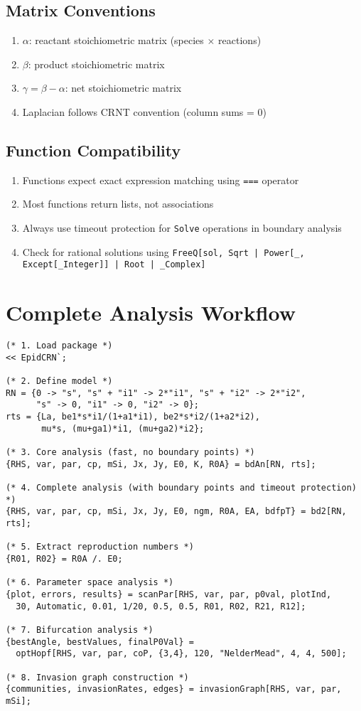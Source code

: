 \documentclass{article}
\begin{document}
\subsection{Matrix Conventions}
\begin{enumerate}
\item $\alpha$: reactant stoichiometric matrix (species $\times$ reactions)
\item $\beta$: product stoichiometric matrix
\item $\gamma = \beta - \alpha$: net stoichiometric matrix
\item Laplacian follows CRNT convention (column sums = 0)
\end{enumerate}

\subsection{Function Compatibility}
\begin{enumerate}
\item Functions expect exact expression matching using \texttt{===} operator
\item Most functions return lists, not associations
\item Always use timeout protection for \texttt{Solve} operations in boundary analysis
\item Check for rational solutions using \texttt{FreeQ[sol, Sqrt | Power[\_, Except[\_Integer]] | Root | \_Complex]}
\end{enumerate}

\section{Complete Analysis Workflow}

\begin{lstlisting}
(* 1. Load package *)
<< EpidCRN`;

(* 2. Define model *)
RN = {0 -> "s", "s" + "i1" -> 2*"i1", "s" + "i2" -> 2*"i2",
      "s" -> 0, "i1" -> 0, "i2" -> 0};
rts = {La, be1*s*i1/(1+a1*i1), be2*s*i2/(1+a2*i2),
       mu*s, (mu+ga1)*i1, (mu+ga2)*i2};

(* 3. Core analysis (fast, no boundary points) *)
{RHS, var, par, cp, mSi, Jx, Jy, E0, K, R0A} = bdAn[RN, rts];

(* 4. Complete analysis (with boundary points and timeout protection) *)
{RHS, var, par, cp, mSi, Jx, Jy, E0, ngm, R0A, EA, bdfpT} = bd2[RN, rts];

(* 5. Extract reproduction numbers *)
{R01, R02} = R0A /. E0;

(* 6. Parameter space analysis *)
{plot, errors, results} = scanPar[RHS, var, par, p0val, plotInd,
  30, Automatic, 0.01, 1/20, 0.5, 0.5, R01, R02, R21, R12];

(* 7. Bifurcation analysis *)
{bestAngle, bestValues, finalP0Val} =
  optHopf[RHS, var, par, coP, {3,4}, 120, "NelderMead", 4, 4, 500];

(* 8. Invasion graph construction *)
{communities, invasionRates, edges} = invasionGraph[RHS, var, par, mSi];
\end{lstlisting}
\end{document}
